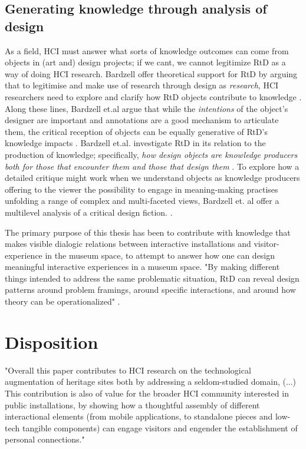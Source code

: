 \subsection{Generating knowledge through analysis of design}
As a field, HCI must answer what sorts of knowledge outcomes can come from objects in (art and) design projects; if we cant, we cannot legitimize RtD as a way of doing HCI research. Bardzell offer theoretical support for RtD by arguing that to legitimise and make use of research through design as \emph{research}, HCI researchers need to explore and clarify how RtD objects contribute to knowledge \autocite[p.2093]{bardzell_immodest_2015}. Along these lines, Bardzell et.al argue that while the \emph{intentions} of the object's designer are important and annotations are a good mechanism to articulate them, the critical reception of objects can be equally generative of RtD's knowledge impacts \autocite[p. 2093]{bardzell_immodest_2015}. Bardzell et.al. investigate RtD in its relation to the production of knowledge; specifically, \emph{how design objects are knowledge producers both for those that encounter them and those that design them} \autocite[p. 2093]{bardzell_immodest_2015}. To explore how a detailed critique might work when we understand objects as knowledge producers offering to the viewer the possibility to engage in meaning-making practises unfolding a range of complex and multi-faceted views, Bardzell et. al offer a multilevel analysis of a critical design fiction. \autocite[p. 2094]{bardzell_immodest_2015}.

The primary purpose of this thesis has been to contribute with knowledge that makes visible dialogic relations between interactive installations and visitor-experience in the museum space, to attempt to answer how one can design meaningful interactive experiences in a museum space. "By making different things intended to address the same problematic situation, RtD can reveal design patterns \autocite{Alexander_book} around problem framings, around specific interactions, and around how theory can be operationalized" \autocite[p. 178]{zimmerman_research_2014}.


\section{Disposition}

"Overall this paper contributes to HCI research on the technological augmentation of heritage sites both by addressing a seldom-studied domain, (...) This contribution is also of value for the broader HCI community interested in public installations, by showing how a thoughtful assembly of different interactional elements (from mobile applications, to standalone pieces and low-tech tangible components) can engage visitors and engender the establishment of personal connections." \autocite{ciolfi_designing_2012}


